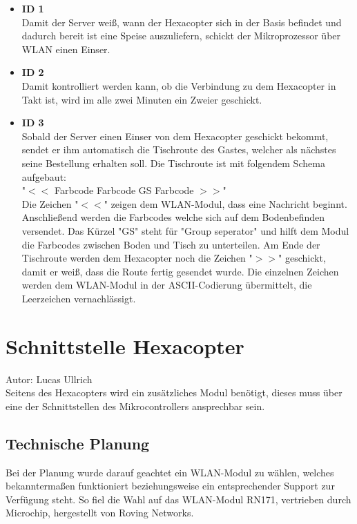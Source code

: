 \begin{itemize}
    \item \textbf{ID 1}\\
Damit der Server weiß, wann der Hexacopter sich in der Basis befindet und dadurch bereit ist eine Speise auszuliefern, schickt der Mikroprozessor über WLAN einen Einser.

    \item \textbf{ID 2}\\
Damit kontrolliert werden kann, ob die Verbindung zu dem Hexacopter in Takt ist, wird im alle zwei Minuten ein Zweier geschickt.

    \item \textbf{ID 3}\\
Sobald der Server einen Einser von dem Hexacopter geschickt bekommt, sendet er ihm automatisch die Tischroute des Gastes, welcher als nächstes seine Bestellung erhalten soll.
Die Tischroute ist mit folgendem Schema aufgebaut: \\
"$<<$ Farbcode Farbcode GS Farbcode $>>$" \\
Die Zeichen "$<<$" zeigen dem WLAN-Modul, dass eine Nachricht beginnt.
Anschließend werden die Farbcodes welche sich auf dem Bodenbefinden versendet.
Das Kürzel "GS" steht für "Group seperator" und hilft dem Modul die Farbcodes zwischen Boden und Tisch zu unterteilen.
Am Ende der Tischroute werden dem Hexacopter noch die Zeichen "$>>$" geschickt, damit er weiß, dass die Route fertig gesendet wurde.
Die einzelnen Zeichen werden dem WLAN-Modul in der ASCII-Codierung übermittelt, die Leerzeichen vernachlässigt.
  \end{itemize}

\section{Schnittstelle Hexacopter}
Autor: Lucas Ullrich\\
Seitens des Hexacopters wird ein zusätzliches Modul benötigt, dieses muss über eine der Schnittstellen des Mikrocontrollers ansprechbar sein.

  \subsection{Technische Planung}
  Bei der Planung wurde darauf geachtet ein WLAN-Modul zu wählen, welches bekanntermaßen funktioniert beziehungsweise ein entsprechender Support zur Verfügung steht.
  So fiel die Wahl auf das WLAN-Modul RN171, vertrieben durch Microchip, hergestellt von Roving Networks.

